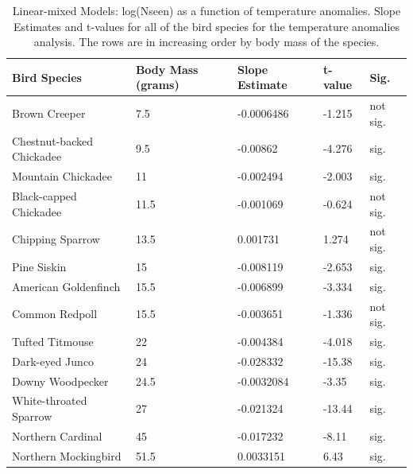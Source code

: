 \begin{longtable}[c]{|l|l|l|l|l|}
\caption{Linear-mixed Models: log(Nseen) as a function of temperature anomalies. Slope Estimates and t-values for all of the bird species for the temperature anomalies analysis. The rows are in increasing order by body mass of the species.}
\label{my-label}\\
\hline
Bird Species              & Body Mass (grams) & Slope Estimate & t-value & Sig.     \\ \hline
\endhead
%
Brown Creeper             & 7.5               & -0.0006486     & -1.215  & not sig. \\ \hline
Chestnut-backed Chickadee & 9.5               & -0.00862       & -4.276  & sig.     \\ \hline
Mountain Chickadee        & 11                & -0.002494      & -2.003  & sig.     \\ \hline
Black-capped Chickadee    & 11.5              & -0.001069      & -0.624  & not sig. \\ \hline
Chipping Sparrow          & 13.5              & 0.001731       & 1.274   & not sig. \\ \hline
Pine Siskin               & 15                & -0.008119      & -2.653  & sig.     \\ \hline
American Goldenfinch      & 15.5              & -0.006899      & -3.334  & sig.     \\ \hline
Common Redpoll            & 15.5              & -0.003651      & -1.336  & not sig. \\ \hline
Tufted Titmouse           & 22                & -0.004384      & -4.018  & sig.     \\ \hline
Dark-eyed Junco           & 24                & -0.028332      & -15.38  & sig.     \\ \hline
Downy Woodpecker          & 24.5              & -0.0032084     & -3.35   & sig.     \\ \hline
White-throated Sparrow    & 27                & -0.021324      & -13.44  & sig.     \\ \hline
Northern Cardinal         & 45                & -0.017232      & -8.11   & sig.     \\ \hline
Northern Mockingbird      & 51.5              & 0.0033151      & 6.43    & sig.     \\ \hline

\end{longtable}
